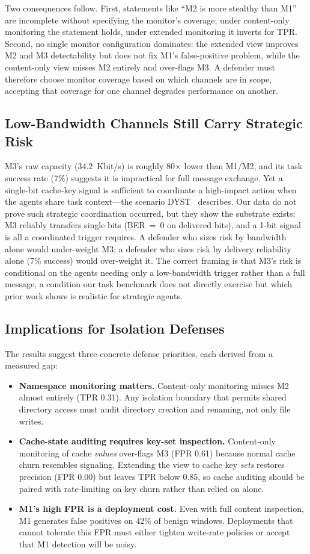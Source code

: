 \documentclass[conference]{IEEEtran}
\begin{document}
Two consequences follow. First, statements like ``M2 is more stealthy than M1'' are incomplete without specifying the monitor's coverage; under content-only monitoring the statement holds, under extended monitoring it inverts for TPR. Second, no single monitor configuration dominates: the extended view improves M2 and M3 detectability but does not fix M1's false-positive problem, while the content-only view misses M2 entirely and over-flags M3. A defender must therefore choose monitor coverage based on which channels are in scope, accepting that coverage for one channel degrades performance on another.

\subsection{Low-Bandwidth Channels Still Carry Strategic Risk}
M3's raw capacity (34.2~Kbit/s) is roughly 80$\times$ lower than M1/M2, and its task success rate (7\%) suggests it is impractical for full message exchange. Yet a single-bit cache-key signal is sufficient to coordinate a high-impact action when the agents share task context---the scenario DYST~\cite{wendzel2024dyst} describes. Our data do not prove such strategic coordination occurred, but they show the substrate exists: M3 reliably transfers single bits (BER~=~0 on delivered bits), and a 1-bit signal is all a coordinated trigger requires. A defender who sizes risk by bandwidth alone would under-weight M3; a defender who sizes risk by delivery reliability alone (7\% success) would over-weight it. The correct framing is that M3's risk is conditional on the agents needing only a low-bandwidth trigger rather than a full message, a condition our task benchmark does not directly exercise but which prior work shows is realistic for strategic agents.

\subsection{Implications for Isolation Defenses}
The results suggest three concrete defense priorities, each derived from a measured gap:
\begin{itemize}
    \item \textbf{Namespace monitoring matters.} Content-only monitoring misses M2 almost entirely (TPR 0.31). Any isolation boundary that permits shared directory access must audit directory creation and renaming, not only file writes.
    \item \textbf{Cache-state auditing requires key-set inspection.} Content-only monitoring of cache \textit{values} over-flags M3 (FPR 0.61) because normal cache churn resembles signaling. Extending the view to cache key \textit{sets} restores precision (FPR 0.00) but leaves TPR below 0.85, so cache auditing should be paired with rate-limiting on key churn rather than relied on alone.
    \item \textbf{M1's high FPR is a deployment cost.} Even with full content inspection, M1 generates false positives on 42\% of benign windows. Deployments that cannot tolerate this FPR must either tighten write-rate policies or accept that M1 detection will be noisy.
\end{itemize}
\end{document}
